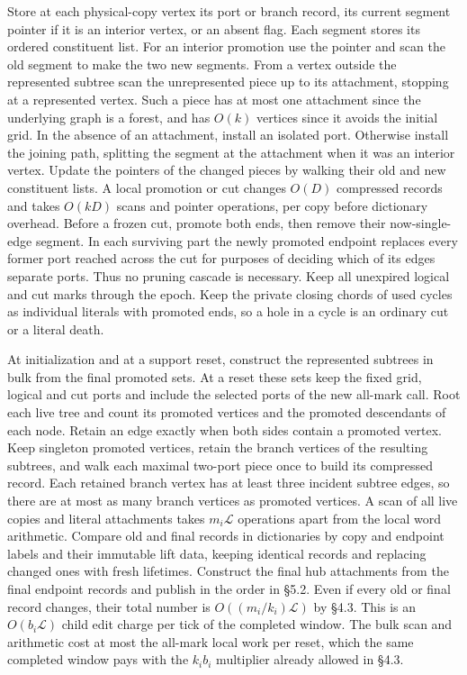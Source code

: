 \documentclass[11pt]{article}
\begin{document}
Store at each physical-copy vertex its port or branch record, its current segment pointer if it is an interior vertex, or an absent flag. Each segment stores its ordered constituent list. For an interior promotion use the pointer and scan the old segment to make the two new segments. From a vertex outside the represented subtree scan the unrepresented piece up to its attachment, stopping at a represented vertex. Such a piece has at most one attachment since the underlying graph is a forest, and has \(O(k)\) vertices since it avoids the initial grid. In the absence of an attachment, install an isolated port. Otherwise install the joining path, splitting the segment at the attachment when it was an interior vertex. Update the pointers of the changed pieces by walking their old and new constituent lists. A local promotion or cut changes \(O(D)\) compressed records and takes \(O(kD)\) scans and pointer operations, per copy before dictionary overhead. Before a frozen cut, promote both ends, then remove their now-single-edge segment. In each surviving part the newly promoted endpoint replaces every former port reached across the cut for purposes of deciding which of its edges separate ports. Thus no pruning cascade is necessary. Keep all unexpired logical and cut marks through the epoch. Keep the private closing chords of used cycles as individual literals with promoted ends, so a hole in a cycle is an ordinary cut or a literal death.

At initialization and at a support reset, construct the represented subtrees in bulk from the final promoted sets. At a reset these sets keep the fixed grid, logical and cut ports and include the selected ports of the new all-mark call. Root each live tree and count its promoted vertices and the promoted descendants of each node. Retain an edge exactly when both sides contain a promoted vertex. Keep singleton promoted vertices, retain the branch vertices of the resulting subtrees, and walk each maximal two-port piece once to build its compressed record. Each retained branch vertex has at least three incident subtree edges, so there are at most as many branch vertices as promoted vertices. A scan of all live copies and literal attachments takes \(m_i\mathcal L\) operations apart from the local word arithmetic. Compare old and final records in dictionaries by copy and endpoint labels and their immutable lift data, keeping identical records and replacing changed ones with fresh lifetimes. Construct the final hub attachments from the final endpoint records and publish in the order in §5.2. Even if every old or final record changes, their total number is \(O((m_i/k_i)\mathcal L)\) by §4.3. This is an \(O(b_i\mathcal L)\) child edit charge per tick of the completed window. The bulk scan and arithmetic cost at most the all-mark local work per reset, which the same completed window pays with the \(k_i b_i\) multiplier already allowed in §4.3.
\end{document}
